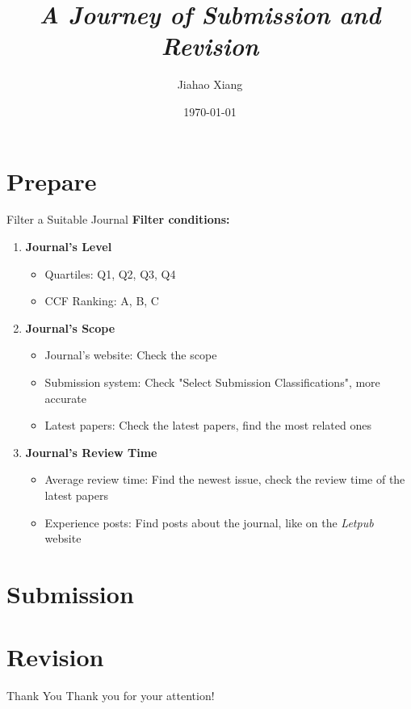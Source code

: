 \documentclass{beamer}
\title{\textit{A Journey of Submission and Revision}}
\author[xjh]{Jiahao Xiang\inst{1}}
\institute{
    \inst{1}
    Hengyang Normal University
}
\date{\today}
\begin{document}
\begin{frame}
    \titlepage
\end{frame}



\section{Prepare}

\begin{frame}{Filter a Suitable Journal}
    \textbf{Filter conditions:}
    \begin{enumerate}
        \item \textbf{Journal's Level}
              \begin{itemize}
                  \item Quartiles: Q1, Q2, Q3, Q4
                  \item CCF Ranking: A, B, C
              \end{itemize}
        \item \textbf{Journal's Scope}
              \begin{itemize}
                  \item Journal's website: Check the scope
                  \item Submission system: Check "Select Submission Classifications", more accurate
                  \item Latest papers: Check the latest papers, find the most related ones
              \end{itemize}
        \item \textbf{Journal's Review Time}
              \begin{itemize}
                  \item Average review time: Find the newest issue, check the review time of the latest papers
                  \item Experience posts: Find posts about the journal, like on the \textit{Letpub} website
              \end{itemize}

    \end{enumerate}
\end{frame}

\section{Submission}

\section{Revision}


\begin{frame}{Thank You}
    \centering
    \Large
    Thank you for your attention! \\
\end{frame}
\end{document}
